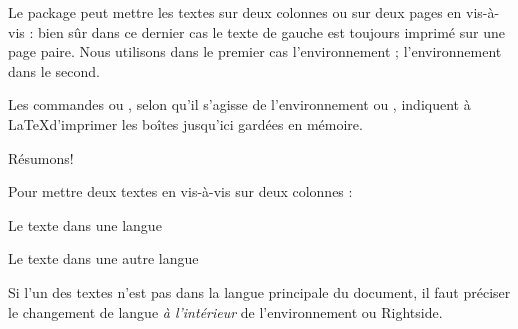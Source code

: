 Le package  peut mettre les textes sur deux colonnes ou sur deux pages en vis-à-vis : bien sûr dans ce dernier  cas le texte de gauche est toujours imprimé sur une page paire.
Nous utilisons dans le premier cas l'environnement  ; l'environnement  dans le second.

Les commandes  ou , selon qu'il s'agisse de l'environnement  ou , indiquent à \LaTeX  d'imprimer les boîtes jusqu'ici gardées en mémoire. 



Résumons!

Pour mettre deux textes en vis-à-vis sur deux colonnes :

\begin{latexcode}

\begin{pages}  %
\begin{Leftside} %
\beginnumbering %
\pstart %
 
Le texte dans une langue 
 
\pend
\endnumbering  %
\end{Leftside} %
 
\begin{Rightside}  %
\beginnumbering
\pstart
 
Le texte dans une autre langue
 
\pend
\endnumbering
\end{Rightside} 
\Pages

\end{pages} %
\end{latexcode}

\begin{attention}
Si l'un des textes n'est pas dans la langue principale du document, il faut préciser le changement de langue \emph{à l'intérieur} de l'environnement  ou {Rightside}.

\begin{latexcode}
\begin{Leftside}
\begin{<langue>}
\end{<langue>}
\end{Leftside}
\end{latexcode}
\end{attention}

